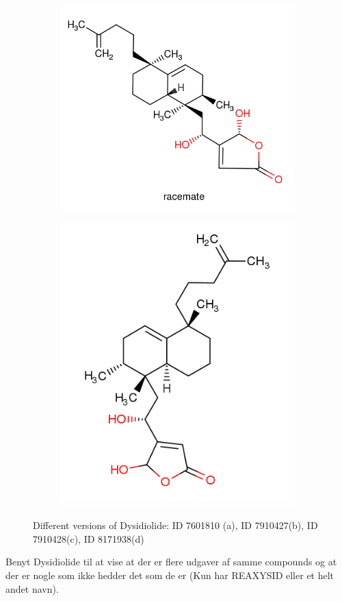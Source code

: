 \documentclass[a4paper,10pt,titlepage]{paper}
\begin{document}
\begin{figure}[H]
\begin{subfigure}{.5\textwidth}
  \caption{}
\end{subfigure}
\begin{subfigure}{.5\textwidth}
  \centering
  \vspace{0.4cm}
  \includegraphics[width=.8\linewidth]{Billeder/Dysidiolide-7910428-Close.png}
  \vspace{1.3cm}
  \caption{}
\end{subfigure}%
\begin{subfigure}{.5\textwidth}
  \centering
  \includegraphics[width=.8\linewidth]{Billeder/Dysidiolide-8171938-Close.png}
  \caption{}
\end{subfigure}
\caption{Different versions of Dysidiolide: ID 7601810 (a), ID 7910427(b), ID 7910428(c), ID 8171938(d)}
\label{fig::SameIDClose}
\end{figure}
Benyt Dysidiolide til at vise at der er flere udgaver af samme compounds og at der er nogle som ikke hedder det som de er (Kun har REAXYSID eller et helt andet navn).
\end{document}
